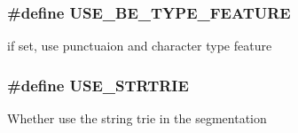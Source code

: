 \subsubsection[{USE\_\-BE\_\-TYPE\_\-FEATURE}]{\setlength{\rightskip}{0pt plus 5cm}\#define USE\_\-BE\_\-TYPE\_\-FEATURE}\label{cmacconfig_8h_a435943505ae5e7a8712d51341bd05808}
if set, use punctuaion and character type feature 
\subsubsection[{USE\_\-STRTRIE}]{\setlength{\rightskip}{0pt plus 5cm}\#define USE\_\-STRTRIE}\label{cmacconfig_8h_afa0bb5c841887bf16853c4e828a8b416}
Whether use the string trie in the segmentation 